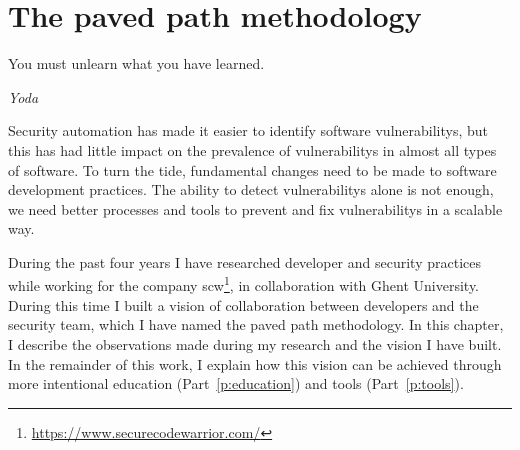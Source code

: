 \chapter{The paved path methodology}
\label{ch:vision}

\epigraph{You must unlearn what you have learned.}{\textit{Yoda}}

Security automation has made it easier to identify software \glspl{vulnerability}, but this has had little impact on the prevalence of \glspl{vulnerability} in almost all types of software. 
To turn the tide, fundamental changes need to be made to software development practices. The ability to detect \glspl{vulnerability} alone is not enough, we need better processes and tools to prevent and fix \glspl{vulnerability} in a scalable way.

During the past four years I have researched developer and security practices while working for the company \gls{scw}\footnote{\url{https://www.securecodewarrior.com/}}, in collaboration with Ghent University.
During this time I built a vision of collaboration between developers and the security team, which I have named the paved path methodology.
In this chapter, I describe the observations made during my research and the vision I have built.
In the remainder of this work, I explain how this vision can be achieved through more intentional education (Part~\ref{p:education}) and tools (Part~\ref{p:tools}).


